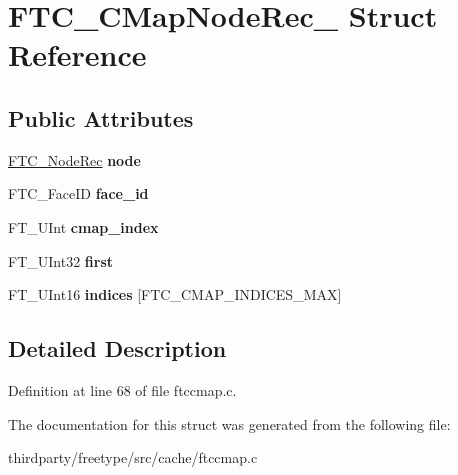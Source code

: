 \hypertarget{struct_f_t_c___c_map_node_rec__}{}\section{F\+T\+C\+\_\+\+C\+Map\+Node\+Rec\+\_\+ Struct Reference}
\label{struct_f_t_c___c_map_node_rec__}
\subsection*{Public Attributes}
\begin{DoxyCompactItemize}
\item 
\mbox{\label{struct_f_t_c___c_map_node_rec___a027dbba40fff69333ec20b4bc311a4f0}} 
\hyperlink{struct_f_t_c___node_rec__}{F\+T\+C\+\_\+\+Node\+Rec} {\bfseries node}
\item 
\mbox{\label{struct_f_t_c___c_map_node_rec___af2ca35f6d1e802f1613be2145097ecb5}} 
F\+T\+C\+\_\+\+Face\+ID {\bfseries face\+\_\+id}
\item 
\mbox{\label{struct_f_t_c___c_map_node_rec___a8af466d65b197704ca39be5e7b0fa2ed}} 
F\+T\+\_\+\+U\+Int {\bfseries cmap\+\_\+index}
\item 
\mbox{\label{struct_f_t_c___c_map_node_rec___a386e8bde9f720faeb8c1437fb0b6b593}} 
F\+T\+\_\+\+U\+Int32 {\bfseries first}
\item 
\mbox{\label{struct_f_t_c___c_map_node_rec___ae3801fdfb4ec0e8c2ac9dd3e92207f44}} 
F\+T\+\_\+\+U\+Int16 {\bfseries indices} \mbox{[}F\+T\+C\+\_\+\+C\+M\+A\+P\+\_\+\+I\+N\+D\+I\+C\+E\+S\+\_\+\+M\+AX\mbox{]}
\end{DoxyCompactItemize}


\subsection{Detailed Description}


Definition at line 68 of file ftccmap.\+c.



The documentation for this struct was generated from the following file\+:\begin{DoxyCompactItemize}
\item 
thirdparty/freetype/src/cache/ftccmap.\+c\end{DoxyCompactItemize}
